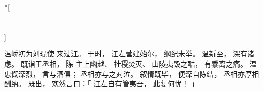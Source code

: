 
\switchcolumn[0]*[\section{}]

温峤初为刘琨使
来过江。
于时，
江左营建始尔，
纲纪未举。
温新至，
深有诸虑。
既诣王丞相，
陈
主上幽越、
社稷焚灭、
山陵夷毁之酷，
有黍离之痛。
温忠慨深烈，
言与泗俱；
丞相亦与之对泣。
叙情既毕，
便深自陈结，
丞相亦厚相酬纳。
既出，
欢然言曰：「
    江左自有管夷吾，
    此复何忧！
」

\switchcolumn



